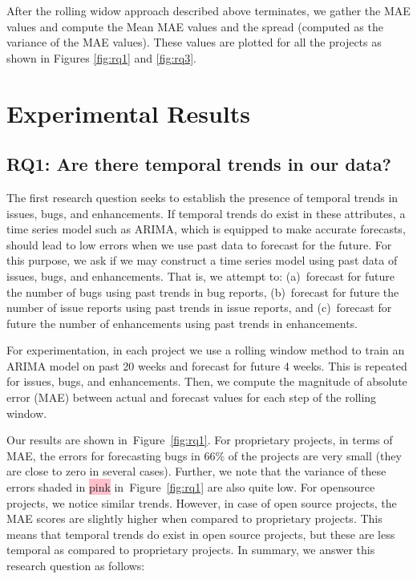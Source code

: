\documentclass[sigconf, preprint]{acmart}
\newcommand{\fig}[1]{Figure~\ref{fig:#1}}
\begin{document}
After the rolling widow approach described above terminates, we gather the MAE 
values and compute the Mean MAE values and the spread 
(computed as the variance of the MAE values). These values are 
plotted for all the projects as shown in Figures \ref{fig:rq1} and \ref{fig:rq3}.


\section{Experimental Results}
\label{sect:results}
\subsection*{\normalsize{RQ1: Are there temporal trends in our data?}}
				
				
		The first research question seeks to establish the presence of temporal 
		trends in issues, bugs, and enhancements. If temporal trends do exist in 
		these attributes, a time series model such as ARIMA, which is equipped to 
		make accurate forecasts, should lead to low errors when we use past data to 
		forecast for the future. For this purpose, we ask if we may construct a 
		time series model using past data of issues, bugs, and enhancements. That is, 
        we attempt to: (a)~forecast for future the number of bugs using past trends in bug 
		reports, (b)~forecast for future the number of issue reports using past 
		trends in issue reports, and (c)~forecast for future the number of 
		enhancements using past trends in enhancements.
			
		For experimentation, in each project we use a rolling window 
		method to train an ARIMA model on past 20 weeks and forecast for future 4 
		weeks. This is repeated for issues, bugs, and enhancements. Then, we 
		compute the magnitude of absolute error (MAE) between actual and forecast 
		values for each step of the rolling window.
		
		Our results are shown in~\fig{rq1}. For proprietary projects, in terms of 
		MAE, the errors for forecasting bugs in 66\% of the 
		projects are very small (they are close to zero in several cases). Further, we note that 
		the variance of these errors shaded in \colorbox{pink}{pink} in~\fig{rq1}
		are also quite low. For opensource projects, we notice similar trends. However, in case of open source projects, the MAE 
		scores are slightly higher when compared to proprietary projects. This means 
		that temporal trends do exist in open source projects, but these are less 
		temporal as compared to proprietary projects. In summary, we answer this 
		research question as follows:\\[-0.1cm]
		
\end{document}
